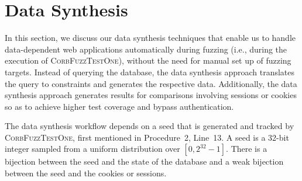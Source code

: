\documentclass[10pt,conference]{IEEEtran}
\begin{document}
 
\section{Data Synthesis}
\label{sec:data-synthesis}

In this section, we discuss our data synthesis techniques that enable us to handle data-dependent web applications automatically during fuzzing (i.e., during the execution of \textsc{CorbFuzzTestOne}), without the need for manual set up of fuzzing targets. Instead of querying the database, the data synthesis approach translates the query to constraints and generates the respective data. Additionally, the data synthesis approach generates results for comparisons involving sessions or cookies so as to achieve higher test coverage and bypass authentication. 

The data synthesis workflow depends on a seed that is generated and tracked by \textsc{CorbFuzzTestOne}, first mentioned in Procedure~2, Line~13. A seed is a 32-bit integer sampled from a uniform distribution over $[0, 2^{32}-1]$. There is a bijection between the seed and the state of the database and a weak bijection between the seed and the cookies or sessions.




\end{document}
